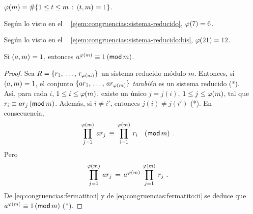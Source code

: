 \begin{coroCongruencias}\label{coro:congruencias:sistema-reducido}
	$\eulerphi(m)=\cardinal{\{1\leq t\leq m\,:\,\mcd{t,m}=1\}}$.
\end{coroCongruencias}

\begin{ejemCongruencias}\label{ejem:congruencias:phi}
	Seg\'un lo visto en el \ejemname~%
	\ref{ejem:congruencias:sistema-reducido}, $\eulerphi(7)=6$.
\end{ejemCongruencias}

\begin{ejemCongruencias}\label{ejem:congruencias:phi:bis}
	Seg\'un lo visto en el \ejemname~%
	\ref{ejem:congruencias:sistema-reducido:bis}, $\eulerphi(21)=12$.
\end{ejemCongruencias}

\begin{teoCongruencias}\label{teo:congruencias:fermatito}
	Si $\mcd{a,m}=1$, entonces $a^{\eulerphi(m)}\equiv 1\tmodulo[m]$.
\end{teoCongruencias}

\begin{proof}
	Sea $R=\{\lista r{\eulerphi(m)}\}$ un sistema reducido m\'odulo $m$.
	Entonces, si $\mcd{a,m}=1$, el conjunto
	$\{ar_1,\,\dots,\,ar_{\eulerphi(m)}\}$ \emph{tambi\'en} es un sistema
	reducido (*). As\'{\i}, para cada $i$, $1\leq i\leq\eulerphi(m)$,
	existe un \'unico $j=j(i)$, $1\leq j\leq\eulerphi(m)$, tal que
	\begin{math}
		r_i\equiv ar_j\tmodulo[m]
	\end{math}.
	Adem\'as, si $i\neq i'$, entonces $j(i)\neq j(i')$ (*).
	En consecuencia,
	\begin{equation}
		\label{eq:congruencias:fermatito:i}
		\prod_{j=1}^{\eulerphi(m)}\,ar_j\,\equiv\,
			\prod_{i=1}^{\eulerphi(m)}\,r_i\modulo[m]
		\text{ .}
	\end{equation}
	Pero
	\begin{equation}
		\label{eq:congruencias:fermatito:ii}
		\prod_{j=1}^{\eulerphi(m)}\,ar_j\,=\,
			a^{\eulerphi(m)}\,\prod_{j=1}^{\eulerphi(m)}\,r_j
		\text{ .}
	\end{equation}
	De \eqref{eq:congruencias:fermatito:i} y de
	\eqref{eq:congruencias:fermatito:ii} se deduce que
	$a^{\eulerphi(m)}\equiv 1\tmodulo[m]$ (*).
\end{proof}

